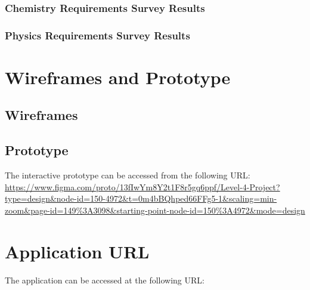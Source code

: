 \documentclass{l4proj}
\begin{document}
\begin{appendices}
\subsection{Chemistry Requirements Survey Results} \label{app:chemReqResults}


\subsection{Physics Requirements Survey Results} \label{app:physReqResults}


\chapter{Wireframes and Prototype}
\section{Wireframes} \label{app:wireframes}













\section{Prototype} \label{app:prototype}
The interactive prototype can be accessed from the following URL:
\newline
\url{https://www.figma.com/proto/13fIwYm8Y2t1F8r5gq6ppf/Level-4-Project?type=design&node-id=150-4972&t=0m4bBQhped66FFg5-1&scaling=min-zoom&page-id=149%3A3098&starting-point-node-id=150%3A4972&mode=design}

\chapter{Application URL} \label{app:application}
The application can be accessed at the following URL:
\newline
\url{}


\end{appendices}
\end{document}
